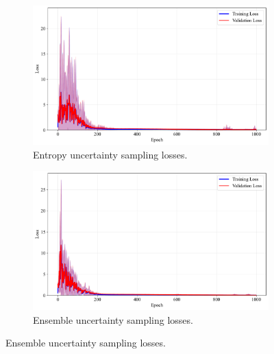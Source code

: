 \documentclass[10pt, conference]{IEEEtran}
\begin{document}
\begin{figure}[!t]
	\begin{subfigure}{\linewidth}
		\centering
		\includegraphics[width=\linewidth]{../results/synfunc/us_losses.pdf}
		\caption{Entropy uncertainty sampling losses.}
		\label{fig:us_losses_synfunc}
	\end{subfigure}
	
	\vspace{0.1em}
	
	\begin{subfigure}{\linewidth}
		\centering
		\includegraphics[width=\linewidth]{../results/synfunc/ensemble_us_losses.pdf}
		\caption{Ensemble uncertainty sampling losses.}
		\label{fig:ensemble_us_losses_synfunc}
	\end{subfigure}
\end{figure}
\end{document}
